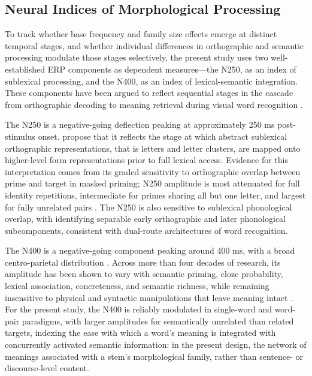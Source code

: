 	
	\subsection{Neural Indices of Morphological Processing}
	
To track whether base frequency and family size effects emerge at distinct temporal stages, and whether individual differences in orthographic and semantic processing modulate those stages selectively, the present study uses two well-established ERP components as dependent measures---the N250, as an index of sublexical processing, and the N400, as an index of lexical-semantic integration. These components have been argued to reflect sequential stages in the cascade from orthographic decoding to meaning retrieval during visual word recognition \citep{graingerWatchingWordGo2009}.
	
	The N250 is a negative-going deflection peaking at approximately 250 ms post-stimulus onset. \citet{holcombTimeCourseVisual2006} propose that it reflects the stage at which abstract sublexical orthographic representations, that is letters and letter clusters, are mapped onto higher-level form representations prior to full lexical access. Evidence for this interpretation comes from its graded sensitivity to orthographic overlap between prime and target in masked priming; N250 amplitude is most attenuated for full identity repetitions, intermediate for primes sharing all but one letter, and largest for fully unrelated pairs \citep{holcombTimeCourseVisual2006, holcomb_exploring_2007}. The N250 is also sensitive to sublexical phonological overlap, with \citet{graingerTimeCourseOrthographic2006} identifying separable early orthographic and later phonological subcomponents, consistent with dual-route architectures of word recognition.
	
	The N400 is a negative-going component peaking around 400 ms, with a broad centro-parietal distribution \citep{kutasReadingSenselessSentences1980}. Across more than four decades of research, its amplitude has been shown to vary with semantic priming, cloze probability, lexical association, concreteness, and semantic richness, while remaining insensitive to physical and syntactic manipulations that leave meaning intact \citep{kutasThirtyYearsCounting2011}. For the present study, the N400 is reliably modulated in single-word and word-pair paradigms, with larger amplitudes for semantically unrelated than related targets, indexing the ease with which a word's meaning is integrated with concurrently activated semantic information: in the present design, the network of meanings associated with a stem's morphological family, rather than sentence- or discourse-level content.
	
